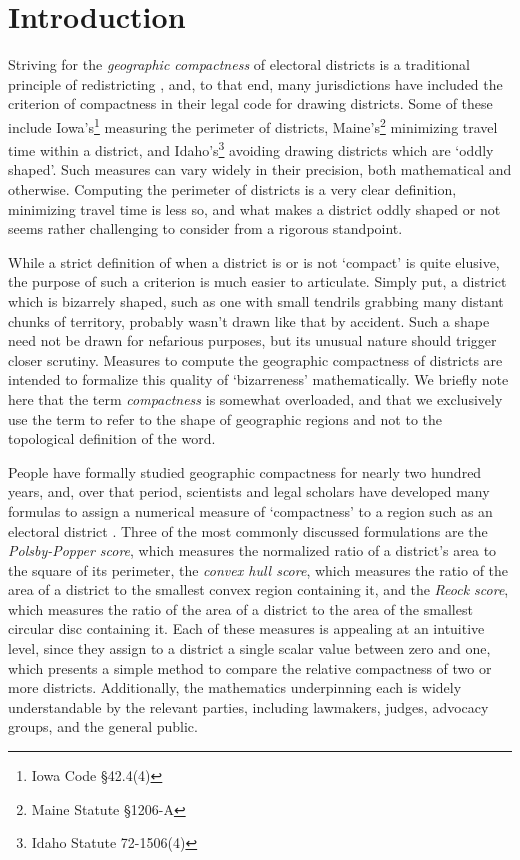 \section{Introduction}
Striving for the \textit{geographic compactness} of electoral
districts is a traditional principle of redistricting \cite{altman_1998}, and, to that
end, many jurisdictions have included the criterion of compactness in
their legal code for drawing districts.  Some of these include Iowa's\footnote{Iowa Code \S42.4(4)} measuring the perimeter of districts, Maine's\footnote{Maine Statute \S1206-A} minimizing travel time within a district, and Idaho's\footnote{Idaho Statute 72-1506(4)} avoiding 
drawing districts which are \enquote*{oddly shaped}.  Such measures can vary widely in their 
precision, both mathematical and otherwise.  Computing the perimeter of districts is a very clear definition, minimizing travel time is less so, and what makes a district oddly shaped or not seems rather challenging to consider from a rigorous standpoint. 

While a strict definition of when a district is or is not \enquote*{compact} is quite elusive, the purpose of such a criterion is much easier to articulate.  Simply put, a district which is bizarrely shaped, such as one with small tendrils grabbing many distant chunks of territory,
probably wasn't drawn like that by accident. Such a shape need not be drawn for nefarious
purposes, but its unusual nature should trigger closer scrutiny.  Measures to compute the
geographic compactness of districts are intended to formalize this quality of \enquote*{bizarreness}
mathematically.  We briefly note here that the term \textit{compactness} is somewhat 
overloaded, and that we exclusively use the term to refer to the shape of geographic 
regions and not to the topological definition of the word.


People have formally studied geographic compactness for nearly two hundred years, and, over that period, scientists and legal scholars have developed many formulas to assign a numerical measure of \enquote*{compactness} to a region such as an electoral district \cite{young_compactness}.
 Three of the most commonly discussed formulations are the \textit{Polsby-Popper score}, which
measures the normalized ratio of a district's area to the square of its
perimeter, the \textit{convex hull score}, which measures the ratio
of the area of a district to the smallest convex region containing it,
and the \textit{Reock score}, which measures the ratio of the area of
a district to the area of the smallest circular disc containing it.  Each of these
measures is appealing at an intuitive level, since they assign to
a district a single scalar value between zero and one, which presents a simple 
method to compare the relative compactness of two or more districts. 
Additionally, the
mathematics underpinning each is widely understandable by the relevant
parties, including lawmakers, judges, advocacy groups, and the general
public.  

